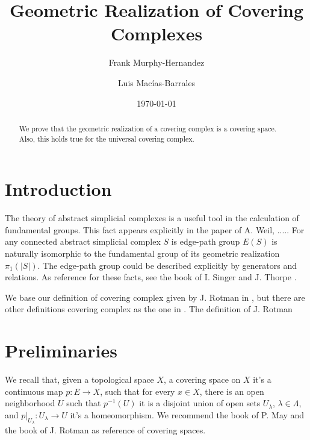\documentclass{amsart}
\begin{document}
\title{Geometric Realization of Covering Complexes}

\author{Frank Murphy-Hernandez}
\address{Facultad de Ciencias, UNAM, Mexico City}

\author{Luis Mac\'ias-Barrales}
\address{Instituto de Matem\'aticas, UNAM, Mexico City}
\email{}


\date{\today}


\begin{abstract}
We prove that the geometric realization of a covering complex is a covering space. Also, this holds true for the universal covering complex.
\end{abstract}

\maketitle

\section*{Introduction}

The theory of abstract simplicial complexes is a useful tool in the calculation of fundamental groups. This fact appears explicitly in the paper \cite{weil1960discrete} of A. Weil, .....
For any connected abstract simplicial complex $S$ is edge-path group $E(S)$ is naturally isomorphic to the fundamental group of its geometric realization $\pi_1(\vert S\vert)$. The edge-path group could be described explicitly by  generators and relations. As reference for these facts, see the book of I. Singer and J. Thorpe \cite{singer2015lecture}. 

We base our definition of covering complex given by J. Rotman in \cite{rotman1973covering}, but there are other definitions covering complex as the one in \cite{abello1991complexity}. The definition of J. Rotman

\section{Preliminaries}


We recall that, given a topological space $X$, a covering space on $X$ it's a continuous map $p\colon E\to X$, such that for every $x\in X$, there is an open neighborhood $U$ such that $p^{-1}(U)$ it is a disjoint union of open sets $U_{\lambda}$, $\lambda\in\Lambda$, and $p|_{U_{\lambda}}\colon U_{\lambda}\to U$ it's a homeomorphism. We recommend the book of P. May \cite{may1999concise} and the book of J. Rotman \cite{rotman2013introduction} as reference of covering spaces.
\end{document}
